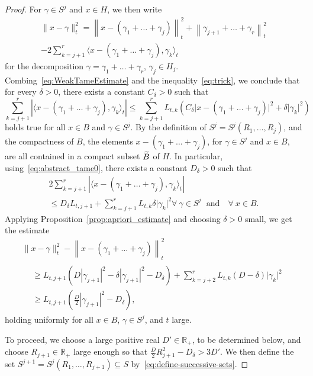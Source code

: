 \documentclass[AHL,Unicode,longabstracts]{cedram}
\newcommand{\innone}[2]{{\langle#2\rangle_{#1}}}
\newcommand{\normsq}[1]{\|#1\|^{2}}
\newcommand{\normbsq}[1]{\left\|#1\right\|^{2}}
\newcommand{\refnormsq}[1]{\lvert#1\rvert^{2}}
\newcommand{\refnormbsq}[1]{\left\lvert#1\right\rvert^{2}}
\newcommand{\abss}[1]{\left\lvert #1\right\rvert}
\newcommand{\R}{\mathbb{R}}
\let\oldtilde\tilde
\renewcommand*{\tilde}[1]{\mathchoice{\widetilde{#1}}{\widetilde{#1}}{\oldtilde{#1}}{\oldtilde{#1}}}
\let\oldforall\forall
\renewcommand*{\forall}{\mathrel{\oldforall}}
\begin{document}
\begin{proof}
For $\gamma \in S^j$ and $x \in H$, we then write
\begin{multline*}
\normsq{x - \gamma}_t = \normbsq{x-(\gamma_1 + \dots +\gamma_j)}_t + \normbsq{\gamma_{j+1} + \dots + \gamma_r}_t\\
- 2\sum_{k = j+1}^r \innone{t}{x- (\gamma_1 + \dots + \gamma_j), \gamma_k}
\end{multline*}
for the decomposition $\gamma = \gamma_1 + \dots + \gamma_r$, $\gamma_j\in H_j$. Combing~\eqref{eq:WeakTameEstimate} and the inequality~\eqref{eq:trick}, we conclude that for every $\delta >0$, there exists a constant $C_\delta >0$ such that
\[
\sum_{k = j+1}^r \abss{\innone{t}{x- (\gamma_1 + \dots + \gamma_j), \gamma_k}} \le \sum_{k =j+1}^r L_{t,k} \left(C_\delta \refnormsq{x- (\gamma_1 + \dots + \gamma_j)} + \delta \refnormsq{\gamma_k}\right)
\]
holds true for all $x\in B$ and $\gamma \in S^j$. By the definition of $S^j = S^j(R_1, \dots, R_j)$, and the compactness of $B$, the elements $x - (\gamma_1+ \dots+\gamma_j)$, for $\gamma \in S^j$ and $x \in B$,\pagebreak{} are all contained in a compact subset $\tilde{B}$ of $H$. In particular, using~\eqref{eq:abstract_tame0}, there exists a constant $D_\delta >0$ such that
\begin{multline*}
2 \sum_{k = j+1}^r \abss{\innone{t}{x- (\gamma_1 + \dots + \gamma_j), \gamma_k}}\\
\le D_\delta L_{t,j+1} + \sum_{k =j+1}^r L_{t,k} \delta \refnormsq{\gamma_k}
\forall \: \gamma \in S^j \;\text{ and}\quad \forall \: x\in B.
\end{multline*}
Applying Proposition~\ref{prop:apriori_estimate} and choosing $\delta >0$ small, we get the estimate
\begin{multline}\label{eq:estimate-induction1}
\normsq{x - \gamma}_t - \normbsq{x-(\gamma_1 + \dots +\gamma_j)}_t\\
\begin{aligned}
&\ge L_{t,j+1} \left(D \refnormbsq{\gamma_{j+1}} - \delta \refnormbsq{\gamma_{j+1}} - D_\delta \right) + \sum_{k=j+2}^r L_{t,k} (D - \delta) \refnormsq{\gamma_k} \\
& \ge L_{t,j+1} \left(\frac{D}{2} \refnormbsq{\gamma_{j+1}} - D_\delta\right),
\end{aligned}
\end{multline}
holding uniformly for all $x \in B$, $\gamma \in S^j$, and $t$ large.

To proceed, we choose a large positive real $D' \in\R_+$, to be determined below, and choose $R_{j+1} \in \R_+$ large enough so that $\frac{D}{2} R_{j+1}^2 - D_\delta >3D'$. We then define the set $S^{j+1} = S^j(R_1, \dots, R_{j+1}) \subseteq S$ by~\eqref{eq:define-successive-sets}.




\end{proof}
\end{document}
